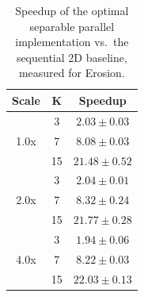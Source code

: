 \documentclass[10pt,twocolumn,letterpaper]{article}
\begin{document}
\begin{table}[H]
\centering
\caption{Speedup of the optimal separable parallel implementation vs.\ the sequential 2D 
baseline, measured for Erosion.}
\label{tab:optimal}
\renewcommand{\arraystretch}{1.15}
\begin{tabular}{ccc}
\hline
\textbf{Scale} & \textbf{K} & \textbf{Speedup} \\
\hline
\multirow{3}{*}{1.0x} & 3  & $2.03 \pm 0.03$ \\
                       & 7  & $8.08 \pm 0.03$ \\
                       & 15 & $21.48 \pm 0.52$ \\
\hline
\multirow{3}{*}{2.0x} & 3  & $2.04 \pm 0.01$ \\
                       & 7  & $8.32 \pm 0.24$ \\
                       & 15 & $21.77 \pm 0.28$ \\
\hline
\multirow{3}{*}{4.0x} & 3  & $1.94 \pm 0.06$ \\
                       & 7  & $8.22 \pm 0.03$ \\
                       & 15 & $22.03 \pm 0.13$ \\
\hline
\end{tabular}
\end{table}
\end{document}
